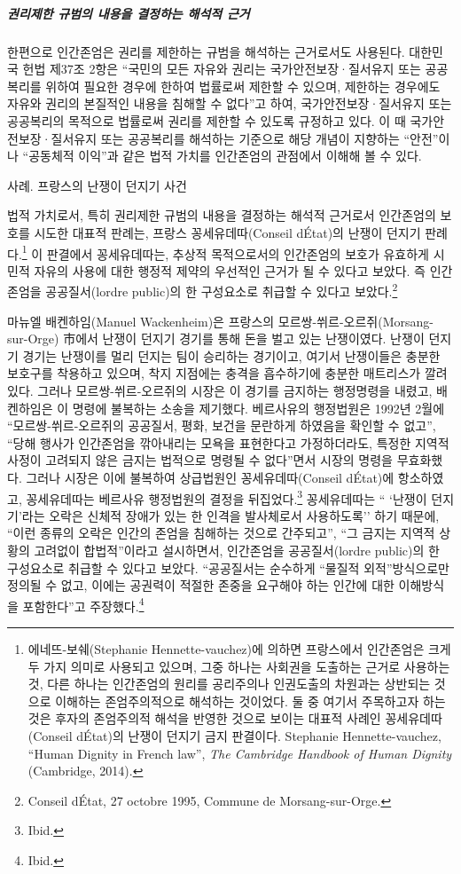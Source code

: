 \subparagraph{권리제한 규범의 내용을 결정하는 해석적 근거}

한편으로 인간존엄은 권리를 제한하는 규범을 해석하는 근거로서도 사용된다. 대한민국 헌법 제37조 2항은 ``국민의 모든 자유와 권리는 국가안전보장·질서유지 또는 공공복리를 위하여 필요한 경우에 한하여 법률로써 제한할 수 있으며, 제한하는 경우에도 자유와 권리의 본질적인 내용을 침해할 수 없다''고 하여, 국가안전보장·질서유지 또는 공공복리의 목적으로 법률로써 권리를 제한할 수 있도록 규정하고 있다. 이 때 국가안전보장·질서유지 또는 공공복리를 해석하는 기준으로 해당 개념이 지향하는 ``안전''이나 ``공동체적 이익''과 같은 법적 가치를 인간존엄의 관점에서 이해해 볼 수 있다.

사례. 프랑스의 난쟁이 던지기 사건

법적 가치로서, 특히 권리제한 규범의 내용을 결정하는 해석적 근거로서 인간존엄의 보호를 시도한 대표적 판례는, 프랑스 꽁세유데따(Conseil d\textquotesingle État)의 난쟁이 던지기 판례다.\footnote{에네뜨-보쉐(Stephanie Hennette-vauchez)에 의하면 프랑스에서 인간존엄은 크게 두 가지 의미로 사용되고 있으며, 그중 하나는 사회권을 도출하는 근거로 사용하는 것, 다른 하나는 인간존엄의 원리를 공리주의나 인권도출의 차원과는 상반되는 것으로 이해하는 존엄주의적으로 해석하는 것이었다. 둘 중 여기서 주목하고자 하는 것은 후자의 존엄주의적 해석을 반영한 것으로 보이는 대표적 사례인 꽁세유데따(Conseil d\textquotesingle État)의 난쟁이 던지기 금지 판결이다. Stephanie Hennette-vauchez, ``Human Dignity in French law'', \emph{The Cambridge Handbook of Human Dignity} (Cambridge, 2014).} 이 판결에서 꽁세유데따는, 추상적 목적으로서의 인간존엄의 보호가 유효하게 시민적 자유의 사용에 대한 행정적 제약의 우선적인 근거가 될 수 있다고 보았다. 즉 인간존엄을 공공질서(l\textquotesingle ordre public)의 한 구성요소로 취급할 수 있다고 보았다.\footnote{Conseil d\textquotesingle État, 27 octobre 1995, Commune de Morsang-sur-Orge.}

마뉴엘 배켄하임(Manuel Wackenheim)은 프랑스의 모르쌍-쒸르-오르쥐(Morsang-sur-Orge) 市에서 난쟁이 던지기 경기를 통해 돈을 벌고 있는 난쟁이였다. 난쟁이 던지기 경기는 난쟁이를 멀리 던지는 팀이 승리하는 경기이고, 여기서 난쟁이들은 충분한 보호구를 착용하고 있으며, 착지 지점에는 충격을 흡수하기에 충분한 매트리스가 깔려 있다. 그러나 모르쌍-쒸르-오르쥐의 시장은 이 경기를 금지하는 행정명령을 내렸고, 배켄하임은 이 명령에 불복하는 소송을 제기했다. 베르사유의 행정법원은 1992년 2월에 ``모르쌍-쒸르-오르쥐의 공공질서, 평화, 보건을 문란하게 하였음을 확인할 수 없고'', ``당해 행사가 인간존엄을 깎아내리는 모욕을 표현한다고 가정하더라도, 특정한 지역적 사정이 고려되지 않은 금지는 법적으로 명령될 수 없다''면서 시장의 명령을 무효화했다. 그러나 시장은 이에 불복하여 상급법원인 꽁세유데따(Conseil d\textquotesingle État)에 항소하였고, 꽁세유데따는 베르사유 행정법원의 결정을 뒤집었다.\footnote{Ibid.} 꽁세유데따는 `` `난쟁이 던지기'라는 오락은 신체적 장애가 있는 한 인격을 발사체로서 사용하도록'' 하기 때문에, ``이런 종류의 오락은 인간의 존엄을 침해하는 것으로 간주되고'', ``그 금지는 지역적 상황의 고려없이 합법적''이라고 설시하면서, 인간존엄을 공공질서(l\textquotesingle ordre public)의 한 구성요소로 취급할 수 있다고 보았다. ``공공질서는 순수하게 ``물질적 외적''방식으로만 정의될 수 없고, 이에는 공권력이 적절한 존중을 요구해야 하는 인간에 대한 이해방식을 포함한다''고 주장했다.\footnote{Ibid.}

